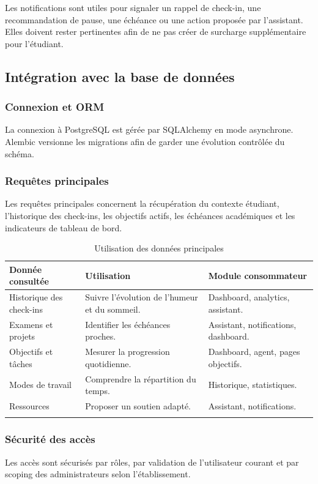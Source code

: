 \documentclass{rapportENSET}
\begin{document}
Les notifications sont utiles pour signaler un rappel de check-in, une recommandation de pause, une échéance ou une action proposée par l'assistant. Elles doivent rester pertinentes afin de ne pas créer de surcharge supplémentaire pour l'étudiant.

\subsection{Intégration avec la base de données}
\subsubsection*{Connexion et ORM}
La connexion à PostgreSQL est gérée par SQLAlchemy en mode asynchrone. Alembic versionne les migrations afin de garder une évolution contrôlée du schéma.

\subsubsection*{Requêtes principales}
Les requêtes principales concernent la récupération du contexte étudiant, l'historique des check-ins, les objectifs actifs, les échéances académiques et les indicateurs de tableau de bord.

\begin{longtable}{@{}L{0.30\textwidth}L{0.30\textwidth}L{0.30\textwidth}@{}}
\toprule
\textbf{Donnée consultée} & \textbf{Utilisation} & \textbf{Module consommateur} \\
\midrule
\endhead
Historique des check-ins & Suivre l'évolution de l'humeur et du sommeil. & Dashboard, analytics, assistant. \\
Examens et projets & Identifier les échéances proches. & Assistant, notifications, dashboard. \\
Objectifs et tâches & Mesurer la progression quotidienne. & Dashboard, agent, pages objectifs. \\
Modes de travail & Comprendre la répartition du temps. & Historique, statistiques. \\
Ressources & Proposer un soutien adapté. & Assistant, notifications. \\
\bottomrule
\caption{Utilisation des données principales}
\end{longtable}

\subsubsection*{Sécurité des accès}
Les accès sont sécurisés par rôles, par validation de l'utilisateur courant et par scoping des administrateurs selon l'établissement.
\end{document}
